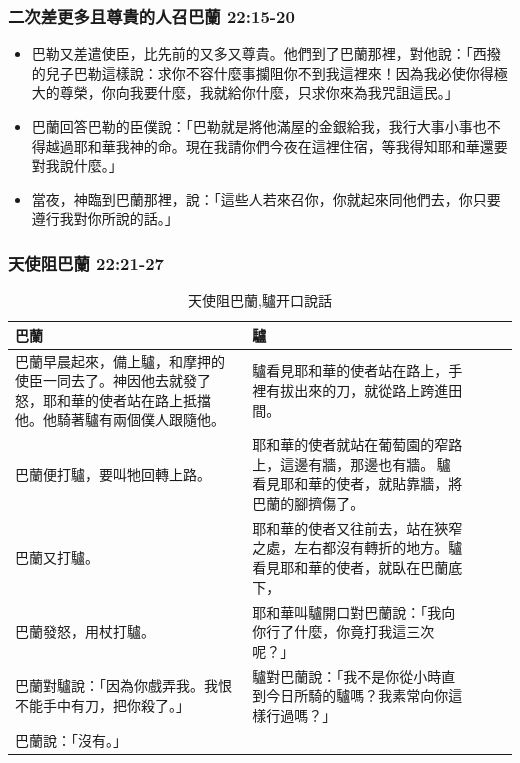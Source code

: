 \subsubsection{二次差更多且尊貴的人召巴蘭 22:15-20}
\begin{itemize} 
\itemsep-.35em
\item 巴勒又差遣使臣，比先前的又多又尊貴。他們到了巴蘭那裡，對他說：「西撥的兒子巴勒這樣說：求你不容什麼事攔阻你不到我這裡來！因為我必使你得極大的尊榮，你向我要什麼，我就給你什麼，只求你來為我咒詛這民。」
\item 巴蘭回答巴勒的臣僕說：「巴勒就是將他滿屋的金銀給我，我行大事小事也不得越過耶和華我神的命。現在我請你們今夜在這裡住宿，等我得知耶和華還要對我說什麼。」
\item 當夜，神臨到巴蘭那裡，說：「這些人若來召你，你就起來同他們去，你只要遵行我對你所說的話。」
\end{itemize}

\subsubsection{天使阻巴蘭 22:21-27}
\begin{table}[H]
\begin{tabular}{@{}p{}*{4}{L{\tabcolsep\relax}}@{}}
\toprule
巴蘭 &驢 \\\hline
巴蘭早晨起來，備上驢，和摩押的使臣一同去了。神因他去就發了怒，耶和華的使者站在路上抵擋他。他騎著驢有兩個僕人跟隨他。&驢看見耶和華的使者站在路上，手裡有拔出來的刀，就從路上跨進田間。\\\hline
巴蘭便打驢，要叫牠回轉上路。&耶和華的使者就站在葡萄園的窄路上，這邊有牆，那邊也有牆。 驢看見耶和華的使者，就貼靠牆，將巴蘭的腳擠傷了。\\\hline
巴蘭又打驢。&耶和華的使者又往前去，站在狹窄之處，左右都沒有轉折的地方。驢看見耶和華的使者，就臥在巴蘭底下，\tabularnewline\hline
巴蘭發怒，用杖打驢。&耶和華叫驢開口對巴蘭說：「我向你行了什麼，你竟打我這三次呢？」\tabularnewline\hline
巴蘭對驢說：「因為你戲弄我。我恨不能手中有刀，把你殺了。」&驢對巴蘭說：「我不是你從小時直到今日所騎的驢嗎？我素常向你這樣行過嗎？」\tabularnewline\hline
巴蘭說：「沒有。」&\tabularnewline\hline
\bottomrule
\end{tabular}
\caption{天使阻巴蘭,驢开口說話}
\end{table} 

